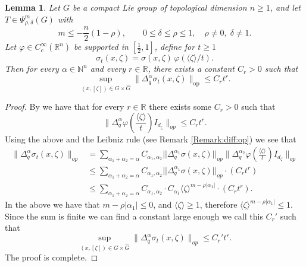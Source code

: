 \documentclass[12pt, reqno]{amsart}
\newtheorem{lemma}[theorem]{Lemma}
\theoremstyle{definition}
\theoremstyle{remark}
\numberwithin{equation}{section}
\begin{document}
\begin{lemma}\label{smoothing}
Let $G$ be a compact Lie group of topological dimension $n \ge 1$, and let 
$T \in \Psi^{m}_{\rho,\delta}(G)$ with
\[
m \le -\frac{n}{2}(1-\rho),
\qquad 0 \le \delta \le \rho \le 1, \quad \rho\neq0,\;\delta \ne 1.
\]
Let $\varphi \in C_c^\infty(\mathbb{R}^n)$ be supported in $[\tfrac{1}{2},1]$, define for $t \ge 1$ 
\[
\sigma_t(x,\zeta) = \sigma(x,\zeta)\,\varphi(\langle \zeta \rangle/t).
\]
Then for every $\alpha \in \mathbb{N}^n$ and every $r \in \mathbb{R}$, there exists a constant $C_r > 0$ such that
\[
\sup_{(x,[\zeta])\in G\times\widehat{G}}\|\Delta_q^\alpha \sigma_t(x,\zeta)\|_{\mathrm{op}} \le C_r t^r.
\]
\end{lemma}
\begin{proof}
    By \cite[Lemma 6.8]{12} we have that for every $r\in\mathbb{R}$ there exists some $C_r>0$ such that
    \begin{equation*}
        \|\Delta_{q}^{\alpha}\varphi\left(\frac{\langle\zeta\rangle}{t} \right)I_{d_\zeta}\|_{op}\leq C_rt^r.
    \end{equation*}
    Using the above and the Leibniz rule (see Remark \ref{Remark:diff:op}) we see that
    \begin{equation*}
        \begin{aligned}
            \|\Delta_{q}^{\alpha}\sigma_t(x,\zeta)\|_{op}&=\sum_{\alpha_1+\alpha_2=\alpha}C_{\alpha_1,\alpha_2}||\Delta_{q}^{\alpha_1}\sigma(x,\zeta)||_{op}\|\Delta_{q}^{\alpha_2}\varphi\left(\frac{\langle\zeta\rangle}{t} \right)I_{d_\zeta}\|_{op}\\
            &\leq\sum_{\alpha_1+\alpha_2=\alpha}C_{\alpha_1,\alpha_2}||\Delta^{\alpha_1}_{q}\sigma(x,\zeta)||_{op}\cdot(C_rt^r)\\
            &\leq\sum_{\alpha_1+\alpha_2=\alpha}C_{\alpha_1,\alpha_2}\cdot C_{\alpha_1}\langle\zeta\rangle^{m-\rho|\alpha_1|}\cdot(C_rt^r).
        \end{aligned}
    \end{equation*}
    In the above we have that $m-\rho|\alpha_1|\leq 0$, and $\langle\zeta\rangle\geq1$, therefore $\langle\zeta\rangle^{m-\rho|\alpha_1|}\leq 1$. Since the sum is finite we can find a constant large enough we call this $C_r'$ such that 
    \begin{equation*}
       \sup_{(x,[\zeta])\in G\times\widehat{G}} \|\Delta_{q}^{\alpha}\sigma_t(x,\zeta)\|_{op}\leq C_r't^{r}.
    \end{equation*}
    The proof is complete. 
\end{proof}
\end{document}
